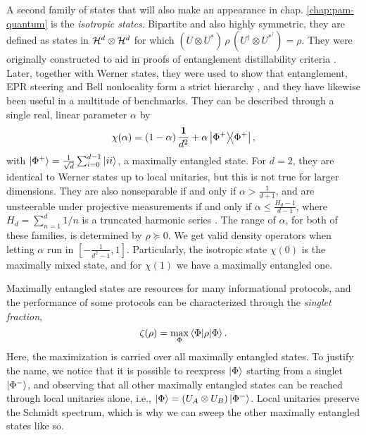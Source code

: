 		A second family of states that will also make an appearance in chap. \ref{chap:pam-quantum} is the \emph{isotropic states}. Bipartite and also highly symmetric, they are defined as states in $\mathcal{H}^{d} \otimes \mathcal{H}^{d}$ for which $(U \otimes U^*) \,\rho\, (U^\dagger \otimes U^{*^\dagger}) = \rho$. They were originally constructed to aid in proofs of entanglement distillability criteria \cite{horodecki_1999_isotropic}. Later, together with Werner states, they were used to show that entanglement, EPR steering and Bell nonlocality form a strict hierarchy \cite{wiseman_2007_steering,quintino_2015_inequivalence}, and they have likewise been useful in a multitude of benchmarks. They can be described through a single real, linear parameter $\alpha$ by
		\begin{equation}
			\chi(\alpha) = \left(1 - \alpha\right) \frac{\mathbf{1}}{d^2} + \alpha \ketbra{\Phi^+}{\Phi^+} ,
			\label{eq:isotropic-states}
		\end{equation}
		with $\ket{\Phi^+} = \frac{1}{\sqrt{d}} \sum_{i = 0}^{d - 1} \ket{ii}$, a maximally entangled state. For $d = 2$, they are identical to Werner states up to local unitaries, but this is not true for larger dimensions. They are also nonseparable if and only if $\alpha > \frac{1}{d+1}$, and are unsteerable under projective measurements if and only if $\alpha \leq \frac{H_d - 1}{d-1}$, where $H_d = \sum_{n=1}^d 1/n$ is a truncated harmonic series \cite{wiseman_2007_steering}. The range of $\alpha$, for both of these families, is determined by $\rho \succeq 0$. We get valid density operators when letting $\alpha$ run in $[-\frac{1}{d^2 - 1},1]$. Particularly, the isotropic state $\chi(0)$ is the maximally mixed state, and for $\chi(1)$ we have a maximally entangled one.
	
		Maximally entangled states are resources for many informational protocols, and the performance of some protocols can be characterized through the \emph{singlet fraction},
		$$
			\zeta(\rho) = \max_\Phi \left\langle \Phi \middle\vert \rho \middle\vert \Phi \right\rangle .
		$$
		Here, the maximization is carried over all maximally entangled states. To justify the name, we notice that it is possible to reexpress $\ket{\Phi}$ starting from a singlet $\ket{\Phi^-}$, and observing that all other maximally entangled states can be reached through local unitaries alone, i.e., $\ket{\Phi} = (U_A \otimes U_B) \ket{\Phi^-}$. Local unitaries preserve the Schmidt spectrum, which is why we can sweep the other maximally entangled states like so.

